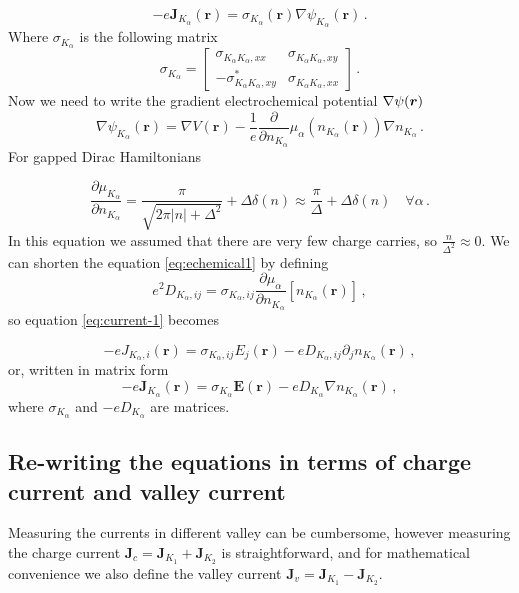 \begin{equation}
    -e\mathbf J_{K_{\alpha}}(\mathbf r)= \sigma_{K_\alpha}(\mathbf r)\nabla \psi_{K_\alpha}(\mathbf r)\,.
    \label{eq:current-1}
\end{equation}
Where $\sigma_{K_\alpha}$ is the following matrix
\[
    \sigma_{K_\alpha}=
    \begin{bmatrix}
        \sigma_{K_\alpha K_\alpha,xx} & \sigma_{K_\alpha K_\alpha,xy}\\
        -\sigma_{K_\alpha K_\alpha,xy}^* & \sigma_{K_\alpha K_\alpha,xx}
    \end{bmatrix}\,.
\]
Now we need to write the gradient electrochemical potential $\nabla \psi(\boldsymbol{r})$
\begin{equation}
    \nabla \psi_{K_\alpha}(\mathbf r)=\nabla V(\mathbf r) -\frac 1e \frac{\partial}{\partial n_{K_\alpha}}\mu_\alpha(n_{K_\alpha}(\mathbf r))\nabla n_{K_\alpha}\,.
    \label{eq:echemical1}
\end{equation}
For gapped Dirac Hamiltonians

\[
\frac{\partial \mu_{K_\alpha}}{\partial n_{K_\alpha}}=\frac{\pi}{\sqrt{2\pi |n|+\Delta^2}}+\Delta\delta(n)\approx \frac \pi\Delta +\Delta\delta(n) \quad \forall \alpha\,.
\]
In this equation we assumed that there are very few charge carries, so $\frac n{\Delta^2}\approx 0$. We can shorten the equation \ref{eq:echemical1} by defining
\begin{equation}
    e^2D_{K_\alpha,ij}=\sigma_{K_\alpha, ij}\frac{\partial \mu_\alpha}{\partial n_{K_\alpha}}[n_{K_\alpha}(\mathbf r)]\,,
\end{equation}
so equation \ref{eq:current-1} becomes

\begin{equation}
    -eJ_{K_\alpha,i}(\mathbf r)=\sigma_{K_\alpha, ij}E_j(\mathbf r) -eD_{K_\alpha,ij}\partial _jn_{K_\alpha}(\mathbf r)\,,
\end{equation}
or, written in matrix form
\begin{equation}
    -e\mathbf J_{K_\alpha}(\mathbf r)=\sigma_{K_\alpha}\mathbf E(\mathbf r) -eD_{K_\alpha}\nabla n_{K_\alpha}(\mathbf r)\,,
\end{equation}
where $\sigma_{K_\alpha}$ and  $-eD_{K_\alpha}$ are matrices.

\subsection{Re-writing the equations in terms of charge current and valley current}
Measuring the currents in different valley can be cumbersome, however measuring the charge current $\mathbf J_{c}=\mathbf J_{K_1}+\mathbf J_{K_2}$ is straightforward, and for mathematical convenience we also define the valley current $\mathbf J_{v}=\mathbf J_{K_1}-\mathbf J_{K_2}$.

